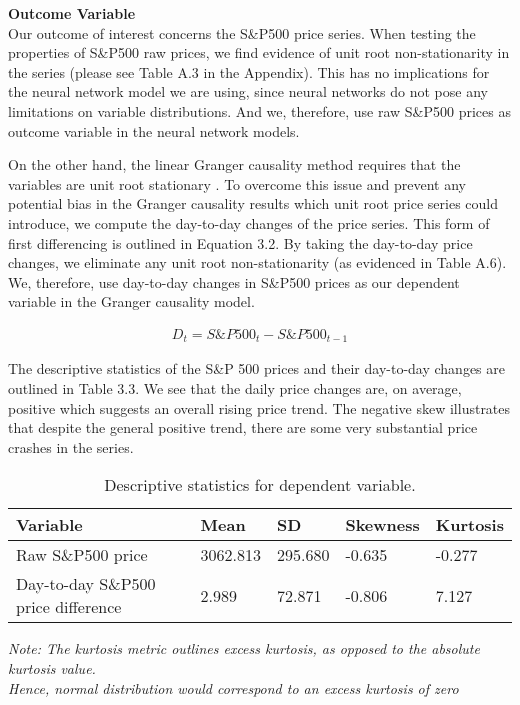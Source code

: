 \textbf{Outcome Variable} \\
Our outcome of interest concerns the S\&P500 price series. When testing the properties of S\&P500 raw prices, we find evidence of unit root non-stationarity in the series (please see Table A.3 in the Appendix). This has no implications for the neural network model we are using, since neural networks do not pose any limitations on variable distributions. And we, therefore, use raw S\&P500 prices as outcome variable in the neural network models. 

On the other hand, the linear Granger causality method requires that the variables are unit root stationary \parencite{wooldridge2015introductory}. To overcome this issue and prevent any potential bias in the Granger causality results which unit root price series could introduce, we compute the day-to-day changes of the price series. This form of first differencing is outlined in Equation 3.2. By taking the day-to-day price changes, we eliminate any unit root non-stationarity (as evidenced in Table A.6). We, therefore, use day-to-day changes in S\&P500 prices as our dependent variable in the Granger causality model. 

\begin{ceqn}
\begin{align}
D_t={S\&P500}_t-{S\&P500}_{t-1}
\end{align}
\end{ceqn}

The descriptive statistics of the S\&P 500 prices and their day-to-day changes are outlined in Table 3.3. We see that the daily price changes are, on average, positive which suggests an overall rising price trend. The negative skew illustrates that despite the general positive trend, there are some very substantial price crashes in the series.

\begin{table}[h]
\centering
\caption{Descriptive statistics for dependent variable.}
\vspace{0.5cm}
\begin{tabular}{lllll}
\hline\hline
Variable & Mean & SD & Skewness & Kurtosis \\ \hline
Raw S\&P500 price & 3062.813 & 295.680 &  -0.635 & -0.277 \\
Day-to-day S\&P500 price difference & 2.989 & 72.871 &  -0.806 & 7.127 \\
\hline
\end{tabular}
\begin{tablenotes}
    \small
      \item{\textit{Note: The kurtosis metric outlines excess kurtosis, as opposed to the absolute kurtosis value. \\Hence, normal distribution would correspond to an excess kurtosis of zero}}
\end{tablenotes}
\end{table}

